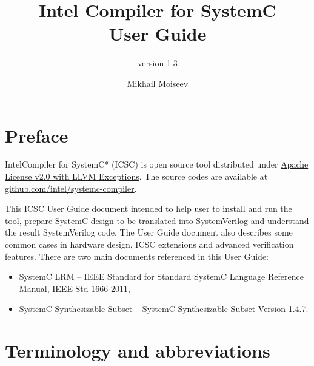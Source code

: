 



\title[Intel Compiler for SystemC User Guide]{Intel Compiler for SystemC \\ User Guide}
\subtitle{version 1.3}

\author{Mikhail Moiseev}


\maketitle
\pagebreak

\setcounter{tocdepth}{2}
\tableofcontents


\pagebreak

 
\section{Preface}

Intel\textregistered Compiler for SystemC* (ICSC) is open source tool distributed under \href{https://github.com/intel/systemc-compiler/blob/main/LICENSE.txt}{Apache License v2.0 with LLVM Exceptions}. The source codes are available at \href{https://github.com/intel/systemc-compiler}{github.com/intel/systemc-compiler}.

This ICSC User Guide document intended to help user to install and run the tool, prepare SystemC design to be translated into SystemVerilog and understand the result SystemVerilog code. The User Guide document also describes some common cases in hardware design, ICSC extensions and advanced verification features.
%
There are two main documents referenced in this User Guide: 
\begin{itemize}
\item SystemC LRM -- IEEE Standard for Standard SystemC Language Reference Manual, IEEE Std 1666 2011,
\item SystemC Synthesizable Subset -- SystemC Synthesizable Subset Version 1.4.7. 
\end{itemize}

\section{Terminology and abbreviations}

